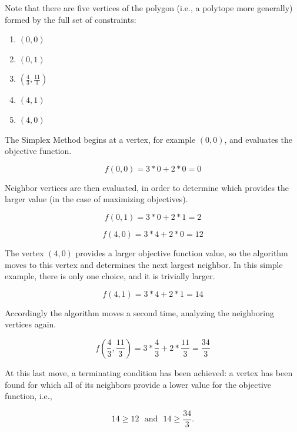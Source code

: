 Note that there are five vertices of the polygon (i.e., a polytope more
generally) formed by the full set of constraints:

\begin{enumerate}
  \item $(0, 0)$
  \item $(0, 1)$
  \item $(\frac{4}{3}, \frac{11}{3})$
  \item $(4, 1)$
  \item $(4, 0)$
\end{enumerate}

The Simplex Method begins at a vertex, for example $(0, 0)$, and evaluates the
objective function.

\begin{equation}
    f(0, 0) = 3 * 0 + 2 * 0 = 0 
\end{equation}

Neighbor vertices are then evaluated, in order to determine which provides the
larger value (in the case of maximizing objectives).

\begin{equation}
    f(0, 1) = 3 * 0 + 2 * 1 = 2 
\end{equation}

\begin{equation}
    f(4, 0) = 3 * 4 + 2 * 0 = 12 
\end{equation}

The vertex $(4, 0)$ provides a larger objective function value, so the algorithm
moves to this vertex and determines the next largest neighbor. In this simple
example, there is only one choice, and it is trivially larger.

\begin{equation}
    f(4, 1) = 3 * 4 + 2 * 1 = 14 
\end{equation}

Accordingly the algorithm moves a second time, analyzing the neighboring
vertices again.

\begin{equation}
    f(\frac{4}{3}, \frac{11}{3}) = 3 * \frac{4}{3} + 2 * \frac{11}{3} = \frac{34}{3} 
\end{equation}

At this last move, a terminating condition has been achieved: a vertex has been
found for which all of its neighbors provide a lower value for the objective
function, i.e.,

\begin{equation}
    14 \geq 12 \:\:\: \text{and} \:\:\: 14 \geq \frac{34}{3}.
\end{equation}

